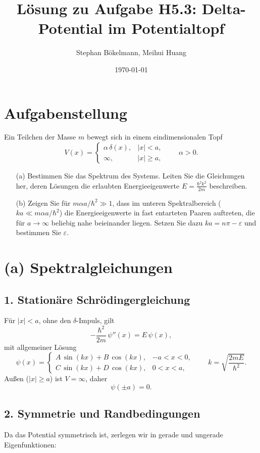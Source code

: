 \documentclass[a4paper,12pt]{article}
\begin{document}
\title{Lösung zu Aufgabe H5.3: Delta-Potential im Potentialtopf}
\author{Stephan Bökelmann, Meihui Huang}
\date{\today}
\maketitle

\section*{Aufgabenstellung}
Ein Teilchen der Masse $m$ bewegt sich in einem eindimensionalen Topf
\[
V(x)=
\begin{cases}
\alpha\,\delta(x), & |x|<a,\\
\infty,            & |x|\ge a,
\end{cases}
\qquad \alpha>0.
\]
\begin{enumerate}
  \item[(a)] Bestimmen Sie das Spektrum des Systems. Leiten Sie die Gleichungen her, 
    deren Lösungen die erlaubten Energieeigenwerte $E=\tfrac{\hbar^2k^2}{2m}$ beschreiben.
  \item[(b)] Zeigen Sie für $m\alpha a/\hbar^2\gg1$, dass im unteren Spektralbereich
    ($ka\ll m\alpha a/\hbar^2$) die Energieeigenwerte in fast entarteten Paaren 
    auftreten, die für $a\to\infty$ beliebig nahe beieinander liegen. 
    Setzen Sie dazu $ka = n\pi - \varepsilon$ und bestimmen Sie $\varepsilon$.
\end{enumerate}

\section{(a) Spektralgleichungen}

\subsection*{1. Stationäre Schrödingergleichung}
Für $|x|<a$, ohne den $\delta$-Impuls, gilt
\[
-\frac{\hbar^2}{2m}\,\psi''(x) = E\,\psi(x),
\]
mit allgemeiner Lösung
\[
\psi(x) = 
\begin{cases}
A\,\sin(kx) + B\,\cos(kx), & -a<x<0,\\
C\,\sin(kx) + D\,\cos(kx), & 0<x<a,
\end{cases}
\qquad
k = \sqrt{\frac{2mE}{\hbar^2}}.
\]
Außen ($|x|\ge a$) ist $V=\infty$, daher
\[
\psi(\pm a) = 0.
\]

\subsection*{2. Symmetrie und Randbedingungen}
Da das Potential symmetrisch ist, zerlegen wir in gerade und ungerade Eigenfunktionen:
\end{document}
